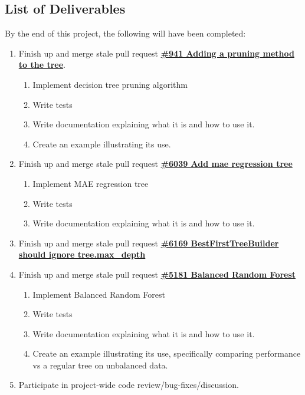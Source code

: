 \documentclass[12pt, oneside]{article}
\begin{document}
\subsection{List of Deliverables}
By the end of this project, the following will have been completed:
\begin{enumerate}
  \item 
  Finish up and merge stale pull request 
  \textbf{\href{https://github.com/scikit-learn/scikit-learn/pull/941}
    {\#941 Adding a pruning method to the tree}}.
  \begin{enumerate}
    \item Implement decision tree pruning algorithm
    \item Write tests
    \item Write documentation explaining what it is and how to use it.
    \item Create an example illustrating its use.
  \end{enumerate}
  \item 
  Finish up and merge stale pull request
  \textbf{\href{https://github.com/scikit-learn/scikit-learn/pull/6039}
    {\#6039 Add mae regression tree}}
  \begin{enumerate}
    \item Implement MAE regression tree
    \item Write tests
    \item Write documentation explaining what it is and how to use it.
  \end{enumerate}
  \item
  Finish up and merge stale pull request
  \textbf{\href{https://github.com/scikit-learn/scikit-learn/pull/6169}
    {\#6169 BestFirstTreeBuilder should ignore tree.max\_depth}}
  \item
  Finish up and merge stale pull request
  \textbf{\href{https://github.com/scikit-learn/scikit-learn/pull/5181}
    {\#5181 Balanced Random Forest}}
  \begin{enumerate}
    \item Implement Balanced Random Forest
    \item Write tests
    \item Write documentation explaining what it is and how to use it.
    \item Create an example illustrating its use, specifically
    comparing performance vs a regular tree on unbalanced data.
  \end{enumerate}
  \item Participate in project-wide code review/bug-fixes/discussion.
\end{enumerate}
\end{document}
